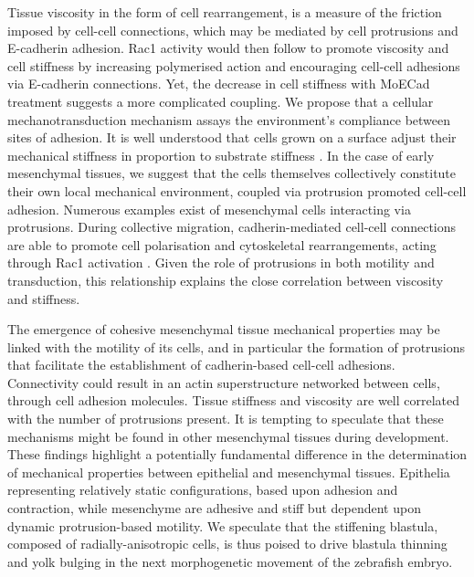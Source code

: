 Tissue viscosity in the form of cell rearrangement, is a measure of the friction imposed by cell-cell connections, which may be mediated by cell protrusions and E-cadherin adhesion.
Rac1 activity would then follow to promote viscosity and cell stiffness by increasing polymerised action and encouraging cell-cell adhesions via E-cadherin connections.
Yet, the decrease in cell stiffness with MoECad treatment suggests a more complicated coupling.
We propose that a cellular mechanotransduction mechanism assays the environment's compliance between sites of adhesion.
It is well understood that cells grown on a surface adjust their mechanical stiffness in proportion to substrate stiffness \cite{(32, 33)}.
In the case of early mesenchymal tissues, we suggest that the cells themselves collectively constitute their own local mechanical environment, coupled via protrusion promoted cell-cell adhesion.
Numerous examples exist of mesenchymal cells interacting via protrusions.
During collective migration, cadherin-mediated cell-cell connections are able to promote cell polarisation and cytoskeletal rearrangements, acting through Rac1 activation \cite{(34)}.
Given the role of protrusions in both motility and transduction, this relationship explains the close correlation between viscosity and stiffness.

The emergence of cohesive mesenchymal tissue mechanical properties may be linked with the motility of its cells, and in particular the formation of protrusions that facilitate the establishment of cadherin-based cell-cell adhesions.
Connectivity could result in an actin superstructure networked between cells, through cell adhesion molecules.
Tissue stiffness and viscosity are well correlated with the number of protrusions present.
It is tempting to speculate that these mechanisms might be found in other mesenchymal tissues during development.
These findings highlight a potentially fundamental difference in the determination of mechanical properties between epithelial and mesenchymal tissues.
Epithelia representing relatively static configurations, based upon adhesion and contraction, while mesenchyme are adhesive and stiff but dependent upon dynamic protrusion-based motility.
We speculate that the stiffening blastula, composed of radially-anisotropic cells, is thus poised to drive blastula thinning and yolk bulging in the next morphogenetic movement of the zebrafish embryo.



